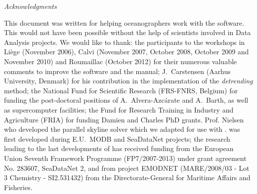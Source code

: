 
\vspace*{\fill}




{\it
\Large{Acknowledgments}
\vspace{1cm}
\parindent 1cm
\begin{center}
\begin{minipage}[c]{.85\textwidth}
\normalsize
This document was written for helping oceanographers work with the \diva software. This would not have been possible without the help of scientists involved in Data Analysis projects.
\newline
\newline
We would like to thank:
\newline
\newline
the participants to the \diva workshops in Li\`{e}ge (November 2006), Calvi (November 2007, October 2008, October 2009 and November 2010) and Roumaillac (October 2012) for their numerous valuable comments to improve the software and the manual;
\newline
\newline
J.~Carstensen (Aarhus University, Denmark) for his contribution in the implementation of the \textit{detrending} method;
\newline
\newline 
the National Fund for Scientific Research (FRS-FNRS, Belgium) for funding the post-doctoral positions of A.~Alvera-Azc\'{a}rate and A.~Barth, as well as supercomputer facilities;
\newline
\newline
the Fund for Research Training in Industry and Agriculture (FRIA) for funding Damien and Charles PhD grants.
\newline
Prof. Nielsen who developed the parallel skyline solver which we adapted for use with \diva \citep{NIELSEN12}.
\newline
\newline
\diva was first developed during E.U.~MODB and SeaDataNet projects; the research leading to the last developments of \diva has received funding from the European Union Seventh Framework Programme (FP7/2007-2013) under grant agreement No. 283607, SeaDataNet 2, and from project EMODNET (MARE/2008/03 - Lot 3 Chemistry - SI2.531432) from the Directorate-General for Maritime Affairs and Fisheries. 
\vspace{2cm}
\end{minipage}

\end{center}
}

\vspace*{\fill}

\newpage
